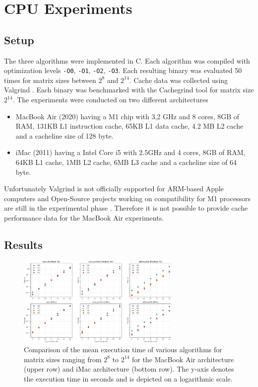 \documentclass[conference]{IEEEtran}
\begin{document}
    \section{CPU Experiments} \label{sec:experiments}
    \subsection{Setup}
    The three algorithms were implemented in C. Each algorithm was compiled with optimization levels \texttt{-O0}, \texttt{-O1}, \texttt{-O2}, \texttt{-O3}. Each resulting binary was evaluated 50 times for matrix sizes between $2^8$ and $2^{14}$. Cache data was collected using Valgrind \cite{valgrind}. Each binary was benchmarked with the Cachegrind tool for matrix size $2^{14}$. The experiments were conducted on two different architectures
    \begin{itemize}
        \item MacBook Air (2020) having a M1 chip with 3,2 GHz and 8 cores, 8GB of RAM, 131KB L1 instruction cache, 65KB L1 data cache, 4.2 MB L2 cache and a cacheline size of 128 byte.
        \item iMac (2011) having a Intel Core i5 with 2.5GHz and 4 cores, 8GB of RAM, 64KB L1 cache, 1MB L2 cache, 6MB L3 cache and a cacheline size of 64 byte.
    \end{itemize}
    Unfortunately Valgrind is not officially supported for ARM-based Apple computers \cite{valgrinddocs} and Open-Source projects working on compatibility for M1 processors are still in the experimental phase \cite{valgrindm1bug}. Therefore it is not possible to provide cache performance data for the MacBook Air experiments. 

    \subsection{Results}   
    
    \begin{figure}[htbp]
        \centering
        \includegraphics[width=0.7\textwidth]{./images/time_comparision.png}
        \caption{Comparison of the mean execution time of various algorithms for matrix sizes ranging from $2^8$ to $2^{14}$ for the MacBook Air architecture (upper row) and iMac architecture (bottom row). The y-axis denotes the execution time in seconds and is depicted on a logarithmic scale.}
        \label{fig:time_comparison}  
    \end{figure}
\end{document}
